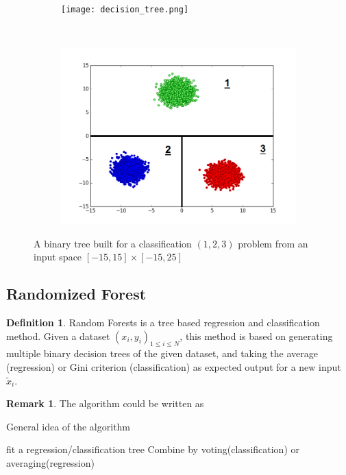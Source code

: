 \documentclass[english,11pt,openany]{report}
\theoremstyle{definition}
\theoremstyle{plain}
\theoremstyle{definition}
\newtheorem{Def}[Th]{Definition}
\newtheorem{Rem}[Th]{Remark}
\begin{document}
\begin{figure}[t!]
	\centering
	\begin{subfigure}[t]{0.3\textwidth}
		\texttt{[image: decision\_tree.png]}
		\caption{}
		\label{fig:gull1} %
	\end{subfigure}
	~~~~~~~~~~~~~~~
	\begin{subfigure}[t]{0.3\textwidth}
		\includegraphics[width=\textwidth]{classification_presentation.png}
		\caption{}
		\label{fig:gull}
	\end{subfigure}
	\caption{A binary tree built for a classification $(1, 2, 3)$ problem from an input space $[-15, 15] \times [-15, 25]$}
\end{figure}


\subsection{Randomized Forest}

\begin{Def}
	Random Forests is a tree based regression and classification method. 
	Given a dataset $\left(x_i, y_i\right)_{1 \leq i \leq N}$, this method is based on generating multiple binary decision trees of the given dataset, and taking the average (regression) or Gini criterion (classification) as expected output for a new input $\tilde{x}_i$.
	
\end{Def}

\begin{Rem}
The algorithm could be written as 
	
\begin{algorithm}[H]
	\caption{General idea of the algorithm}\label{algo:RFgeneral}
	\begin{algorithmic}[1]
		\State fit a regression/classification tree
		\EndFor
		\State Combine by voting(classification) or averaging(regression)
		\EndProcedure
	\end{algorithmic}
\end{algorithm}

\end{Rem}
\end{document}
